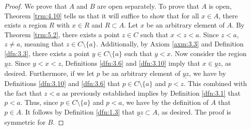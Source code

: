 \documentclass[../main.tex]{subfiles}
\begin{document}
\begin{exercise}
\begin{proof}
        We prove that $A$ and $B$ are open separately. To prove that $A$ is open, Theorem \ref{trm:4.10} tells us that it will suffice to show that for all $x\in A$, there exists a region $R$ with $x\in R$ and $R\subset A$. Let $x$ be an arbitrary element of $A$. By Theorem \ref{trm:5.2}, there exists a point $z\in C$ such that $x<z<a$. Since $z<a$, $z\neq a$, meaning that $z\in C\setminus\{a\}$. Additionally, by Axiom \ref{axm:3.3} and Definition \ref{dfn:3.3}, there exists a point $y\in C\setminus\{a\}$ such that $y<x$. Now consider the region $\underline{yz}$. Since $y<x<z$, Definitions \ref{dfn:3.6} and \ref{dfn:3.10} imply that $x\in\underline{yz}$, as desired. Furthermore, if we let $p$ be an arbitrary element of $\underline{yz}$, we have by Definitions \ref{dfn:3.10} and \ref{dfn:3.6} that $p\in C\setminus\{a\}$ and $p<z$. This combined with the fact that $z<a$ as previously established implies by Definition \ref{dfn:3.1} that $p<a$. Thus, since $p\in C\setminus\{a\}$ and $p<a$, we have by the definition of $A$ that $p\in A$. It follows by Definition \ref{dfn:1.3} that $\underline{yz}\subset A$, as desired. The proof is symmetric for $B$.
    \end{proof}
\end{exercise}
\end{document}
